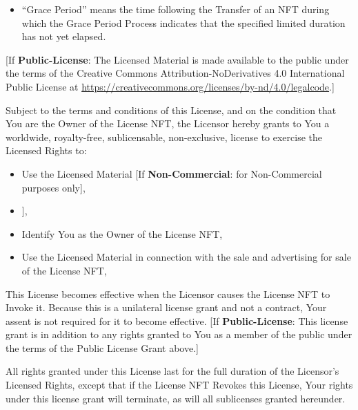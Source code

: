 \documentclass{article}
\newcommand{\keyword}[1]{\textbf{#1}\xspace}
\newcommand{\publiclicense}{\keyword{Public-License}}
\newcommand{\noncommercial}{\keyword{Non-Commercial}}
\newcommand{\noderivative}{\keyword{No-Derivatives}}
\newcommand{\derivativetracking}{\keyword{Derivatives-NFT}}
\newcommand{\sharealike}{\keyword{Derivatives-NFT-Share-Alike}}
\newcommand{\sect}[1]{\vspace{12pt}\noindent{\strong{#1}}}
\newcommand{\iflicenseoption}[2]{[\colorbox{light-gray}{If #1:} #2]}
\newcommand{\ifnotlicenseoption}[2]{[\colorbox{light-gray}{Unless #1:} #2]}
\begin{document}
\begin{sffamily}
\begin{itemize}
	\item ``Grace Period'' means the time following the Transfer of an NFT during which the Grace Period Process indicates that the specified limited duration has not yet elapsed.
	
	\end{itemize}


\sect{Public License Grant}

\iflicenseoption{\publiclicense}{The Licensed Material is made available to the public under the terms of the Creative Commons Attribution-NoDerivatives 4.0 International Public License at \href{https://creativecommons.org/licenses/by-nd/4.0/legalcode}{https://creativecommons.org/licenses/by-nd/4.0/legalcode}.}

\sect{NFT License Grant}

Subject to the terms and conditions of this License, and on the condition that You are the Owner of the License NFT, the Licensor hereby grants to You a worldwide, royalty-free, sublicensable, non-exclusive, license to exercise the Licensed Rights to:
\begin{itemize}
\item Use the Licensed Material \iflicenseoption{\noncommercial}{for Non-Commercial purposes only},
\item \ifnotlicenseoption{\noderivative}{Create and Use Adapted Material \iflicenseoption{\noncommercial}{for Non-Commercial purposes only} \iflicenseoption{\derivativetracking}{provided that the Adapted Material is Derivative Tracked from the License NFT} \iflicenseoption{\sharealike}{provided that the Adapted Material is Share-Alike Sublicensed from the License NFT}},
\item Identify You as the Owner of the License NFT,
\item Use the Licensed Material in connection with the sale and advertising for sale of the License NFT,
\end{itemize}
This License becomes effective when the Licensor causes the License NFT to Invoke it. Because this is a unilateral license grant and not a contract, Your assent is not required for it to become effective. \iflicenseoption{\publiclicense}{This license grant is in addition to any rights granted to You as a member of the public under the terms of the Public License Grant above.}

All rights granted under this License last for the full duration of the Licensor's Licensed Rights, except that if the License NFT Revokes this License, Your rights under this license grant will terminate, as will all sublicenses granted hereunder.


\end{sffamily}
\end{document}
